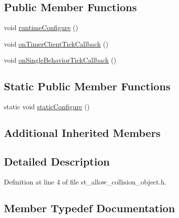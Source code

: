 \subsection*{Public Member Functions}
\begin{DoxyCompactItemize}
\item 
void \hyperlink{structsm__mtc__picknplace_1_1StAllowCollisionObject_aef20da394e1e4bb53b918e9e8c8eabef}{runtime\+Configure} ()
\item 
void \hyperlink{structsm__mtc__picknplace_1_1StAllowCollisionObject_a420046271076ba5c767fe9c36826a92d}{on\+Timer\+Client\+Tick\+Callback} ()
\item 
void \hyperlink{structsm__mtc__picknplace_1_1StAllowCollisionObject_a215f56fe5183209cbacb1a99b8624341}{on\+Single\+Behavior\+Tick\+Callback} ()
\end{DoxyCompactItemize}
\subsection*{Static Public Member Functions}
\begin{DoxyCompactItemize}
\item 
static void \hyperlink{structsm__mtc__picknplace_1_1StAllowCollisionObject_a1833145834d72abe3ea8ff7c0990d561}{static\+Configure} ()
\end{DoxyCompactItemize}
\subsection*{Additional Inherited Members}


\subsection{Detailed Description}


Definition at line 4 of file st\+\_\+allow\+\_\+collision\+\_\+object.\+h.



\subsection{Member Typedef Documentation}

